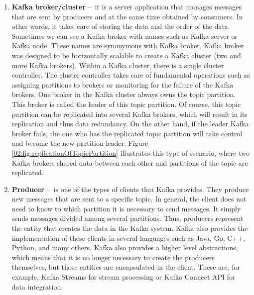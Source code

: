 \begin{enumerate}
    \item \textbf{Kafka broker/cluster} \---\ it is a server application that manages messages that are sent by producers and at the same time obtained by consumers.
    In other words, it takes care of storing the data and the order of the data.
    Sometimes we can see a Kafka broker with names such as Kafka server or Kafka node.
    These names are synonymous with Kafka broker.
    Kafka broker was designed to be horizontally scalable to create a Kafka cluster (two and more Kafka brokers).
    Within a Kafka cluster, there is a single cluster controller.
    The cluster controller takes care of fundamental operations such as assigning partitions to brokers or monitoring for the failure of the Kafka brokers.
    One broker in the Kafka cluster always owns the topic partition.
    This broker is called the leader of this topic partition.
    Of course, this topic partition can be replicated into several Kafka brokers, which will result in its replication and thus data redundancy.
    On the other hand, if the leader Kafka broker fails, the one who has the replicated topic partition will take control and become the new partition leader.
    Figure \ref{02:fig:replicationOfTopicPartition} illustrates this type of scenario, where two Kafka brokers shared data between each other and partitions of the topic are replicated.

    \item \textbf{Producer} \---\ is one of the types of clients that Kafka provides.
    They produce new messages that are sent to a specific topic.
    In general, the client does not need to know to which partition it is necessary to send messages.
    It simply sends messages divided among several partitions.
    Thus, producers represent the entity that creates the data in the Kafka system.
    Kafka also provides the implementation of these clients in several languages such as Java, Go, C++, Python, and many others.
    Kafka also provides a higher level abstractions, which means that it is no longer necessary to create the producers themselves, but those entities are encapsulated in the client.
    These are, for example, Kafka Streams for stream processing or Kafka Connect API for data integration.
    

\end{enumerate}
